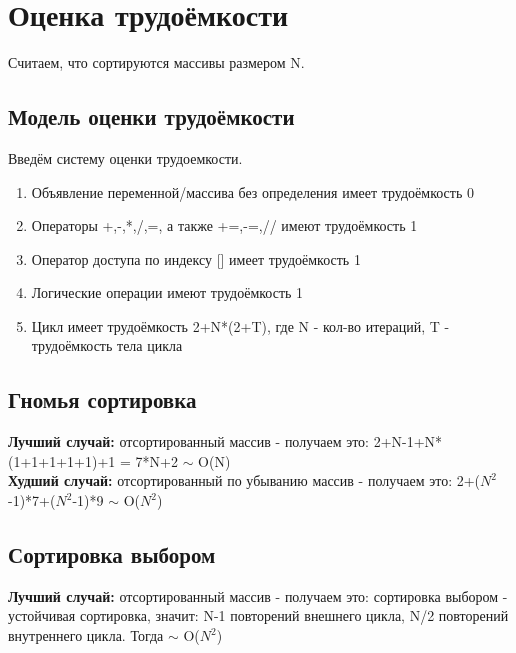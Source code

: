 \documentclass[a4paper,12pt]{report}
\begin{document}
    \section{Оценка трудоёмкости}

       		Считаем, что сортируются массивы размером N.
       		
    \subsection{Модель оценки трудоёмкости}

        Введём систему оценки трудоемкости.

        	\begin{enumerate} 
        		\item Объявление переменной/массива без определения имеет трудоёмкость 0\\
        		\item Операторы +,-,*,/,=, а также +=,-=,// имеют трудоёмкость 1\\
        		\item Оператор доступа по индексу [] имеет трудоёмкость 1\\
        		\item Логические операции имеют трудоёмкость 1\\
        		\item Цикл имеет трудоёмкость 2+N*(2+T), где N - кол-во итераций, T - трудоёмкость тела цикла	
        	\end{enumerate}

	\subsection{Гномья сортировка}

        	\textbf{Лучший случай:} отсортированный массив - получаем это: 2+N-1+N*(1+1+1+1+1)+1 = 7*N+2 $\sim$ O(N) \\
        	
        	\textbf{Худший случай:} отсортированный по убыванию массив - получаем это: 2+($N^{2}$-1)*7+($N^{2}$-1)*9 $\sim$ O($N^{2}$)
        
    \subsection{Сортировка выбором}

        	\textbf{Лучший случай:} отсортированный массив - получаем это: сортировка выбором - устойчивая сортировка, значит:
        	N-1 повторений внешнего цикла, N/2 повторений внутреннего цикла. Тогда $\sim$ O($N^{2}$)\\
        	
\end{document}
